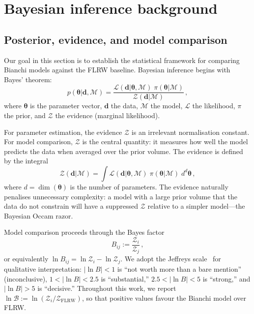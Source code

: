 \section{Bayesian inference background}
\label{sec:bayes-background}

\subsection{Posterior, evidence, and model comparison}
\label{sec:posterior-evidence}

Our goal in this section is to establish the statistical framework
for comparing Bianchi models against the FLRW baseline.  Bayesian
inference begins with Bayes' theorem:
\begin{equation}\label{eq:bayes}
p(\boldsymbol{\theta}|\mathbf{d}, \mathcal{M})
= \frac{\mathcal{L}(\mathbf{d}|\boldsymbol{\theta},
  \mathcal{M})\;\pi(\boldsymbol{\theta}|\mathcal{M})}
       {\mathcal{Z}(\mathbf{d}|\mathcal{M})}\,,
\end{equation}
where $\boldsymbol{\theta}$ is the parameter vector,
$\mathbf{d}$ the data, $\mathcal{M}$ the model,
$\mathcal{L}$ the likelihood, $\pi$ the prior, and
$\mathcal{Z}$ the evidence (marginal likelihood).

For parameter estimation, the evidence $\mathcal{Z}$ is an
irrelevant normalisation constant.  For model comparison,
$\mathcal{Z}$ is the central quantity: it measures how well the
model predicts the data when averaged over the prior volume.
The evidence is defined by the integral
\begin{equation}\label{eq:evidence}
\mathcal{Z}(\mathbf{d}|\mathcal{M})
= \int \mathcal{L}(\mathbf{d}|\boldsymbol{\theta},
  \mathcal{M})\;\pi(\boldsymbol{\theta}|\mathcal{M})\;
  d^d\boldsymbol{\theta}\,,
\end{equation}
where $d = \dim(\boldsymbol{\theta})$ is the number of
parameters.  The evidence naturally penalises unnecessary
complexity: a model with a large prior volume that the data do
not constrain will have a suppressed $\mathcal{Z}$ relative to
a simpler model---the Bayesian Occam razor.

Model comparison proceeds through the Bayes factor
\begin{equation}\label{eq:bayes-factor}
B_{ij} := \frac{\mathcal{Z}_i}{\mathcal{Z}_j}\,,
\end{equation}
or equivalently $\ln B_{ij} = \ln\mathcal{Z}_i -
\ln\mathcal{Z}_j$.  We adopt the Jeffreys
scale~\cite{Jeffreys1961} for qualitative interpretation:
$|\ln B| < 1$ is ``not worth more than a bare mention''
(inconclusive), $1 < |\ln B| < 2.5$ is ``substantial,''
$2.5 < |\ln B| < 5$ is ``strong,'' and $|\ln B| > 5$ is
``decisive.''  Throughout this work, we report $\ln\mathcal{B}
:= \ln(\mathcal{Z}_i/\mathcal{Z}_{\mathrm{FLRW}})$, so that
positive values favour the Bianchi model over FLRW.


